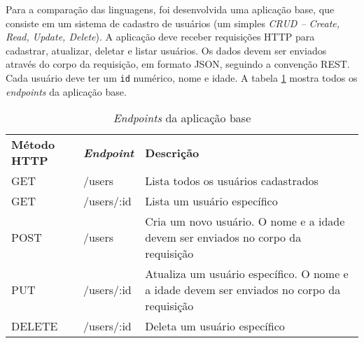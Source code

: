 \documentclass[12pt]{article}
\begin{document}
Para a comparação das linguagens, foi desenvolvida uma aplicação base, que consiste em um sistema de
cadastro de usuários (um simples \textit{CRUD -- Create, Read, Update, Delete}). A aplicação deve receber
requisições HTTP para cadastrar, atualizar, deletar e listar usuários. Os dados devem ser enviados
através do corpo da requisição, em formato JSON, seguindo a convenção REST. Cada usuário deve ter um
\texttt{id} numérico, nome e idade. A tabela \ref{tab-base-endpoints} mostra todos os \textit{endpoints}
da aplicação base.


\begin{table}[htb]
  \caption[\textit{Endpoints} da aplicação base]{\textit{Endpoints} da aplicação base}
  \label{tab-base-endpoints}
  \begin{tabular}{p{2.85cm}p{2.85cm}p{7.55cm}}
    \textbf{Método HTTP} & \textbf{\textit{Endpoint}} & \textbf{Descrição}                                                                         \\
    GET                  & /users                     & Lista todos os usuários cadastrados                                                        \\
    GET                  & /users/:id                 & Lista um usuário específico                                                                \\
    POST                 & /users                     & Cria um novo usuário. O nome e a idade devem ser enviados no corpo da requisição           \\
    PUT                  & /users/:id                 & Atualiza um usuário específico. O nome e a idade devem ser enviados no corpo da requisição \\
    DELETE               & /users/:id                 & Deleta um usuário específico                                                               \\
  \end{tabular}
\end{table}
\end{document}
